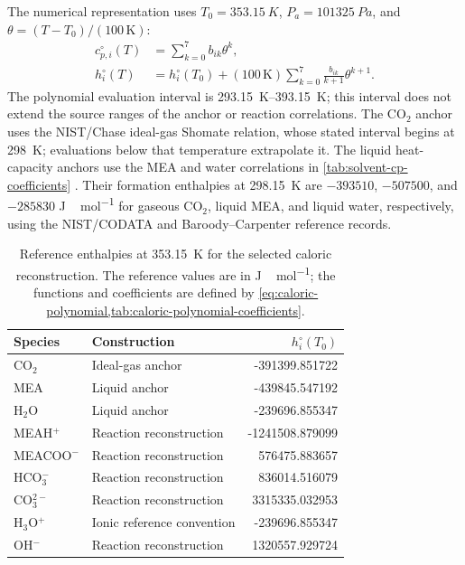 The numerical representation uses $T_0=\qty{353.15}{K}$, $P_a=\qty{101325}{Pa}$, and $\theta=(T-T_0)/(100\,\mathrm K)$:
\begin{align}
c_{p,i}^\circ(T)&=\sum_{k=0}^{7}b_{ik}\theta^k,\\
h_i^\circ(T)&=h_i^\circ(T_0)+(100\,\mathrm K)\sum_{k=0}^{7}\frac{b_{ik}}{k+1}\theta^{k+1}.
\label{eq:caloric-polynomial}
\end{align}
The polynomial evaluation interval is \qtyrange{293.15}{393.15}{K}; this interval does not extend the source ranges of the anchor or reaction correlations.
The CO$_2$ anchor uses the NIST/Chase ideal-gas Shomate relation, whose stated interval begins at \qty{298}{K}; evaluations below that temperature extrapolate it.
The liquid heat-capacity anchors use the MEA and water correlations in \cref{tab:solvent-cp-coefficients} \cite{Hilliard2008}.
Their formation enthalpies at \qty{298.15}{K} are $-393510$, $-507500$, and $-285830$ \unit{J\,mol^{-1}} for gaseous CO$_2$, liquid MEA, and liquid water, respectively, using the NIST/CODATA and Baroody--Carpenter reference records.

\begin{table}[pos=htbp]
\centering\small
\caption{Reference enthalpies at \qty{353.15}{K} for the selected caloric reconstruction. The reference values are in \unit{J\,mol^{-1}}; the functions and coefficients are defined by \cref{eq:caloric-polynomial,tab:caloric-polynomial-coefficients}.}
\label{tab:species-reference-calorics}
\begin{tabular}{@{}llr@{}}
\toprule
Species & Construction & $h_i^\circ(T_0)$\\
\midrule
CO$_2$ & Ideal-gas anchor & -391399.851722\\
MEA & Liquid anchor & -439845.547192\\
H$_2$O & Liquid anchor & -239696.855347\\
MEAH$^+$ & Reaction reconstruction & -1241508.879099\\
MEACOO$^-$ & Reaction reconstruction & 576475.883657\\
HCO$_3^-$ & Reaction reconstruction & 836014.516079\\
CO$_3^{2-}$ & Reaction reconstruction & 3315335.032953\\
H$_3$O$^+$ & Ionic reference convention & -239696.855347\\
OH$^-$ & Reaction reconstruction & 1320557.929724\\
\bottomrule
\end{tabular}
\end{table}

